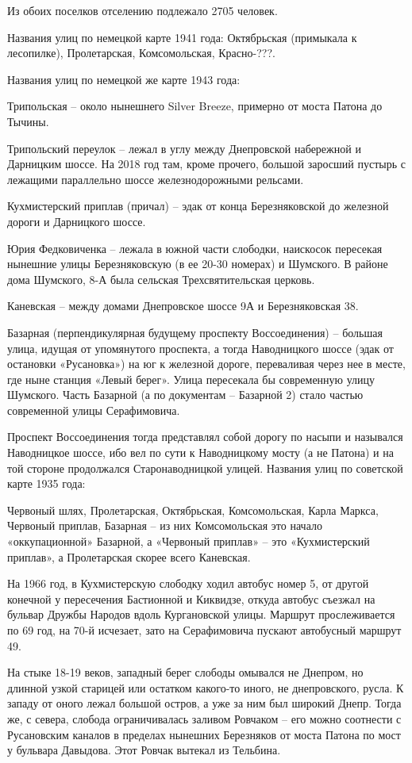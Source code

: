Из обоих поселков отселению подлежало 2705 человек.

Названия улиц по немецкой карте 1941 года: Октябрьская (примыкала к лесопилке), Пролетарская, Комсомольская, Красно-???.

Названия улиц по немецкой же карте 1943 года: 

Трипольская – около нынешнего Silver Breeze, примерно от моста Патона до Тычины. 

Трипольский переулок – лежал в углу между Днепровской набережной и Дарницким шоссе. На 2018 год там, кроме прочего, большой заросший пустырь с лежащими параллельно шоссе железнодорожными рельсами.

Кухмистерский приплав (причал) – эдак от конца Березняковской до железной дороги и Дарницкого шоссе. 

Юрия Федковиченка – лежала в южной части слободки, наискосок пересекая нынешние улицы Березняковскую (в ее 20-30 номерах) и Шумского. В районе дома Шумского, 8-А была сельская Трехсвятительская церковь. 

Каневская – между домами Днепровское шоссе 9А и Березняковская 38. 

Базарная (перпендикулярная будущему проспекту Воссоединения) – большая улица, идущая от упомянутого проспекта, а тогда Наводницкого шоссе (эдак от остановки «Русановка») на юг к железной дороге, переваливая через нее в месте, где ныне станция «Левый берег». Улица пересекала бы современную улицу Шумского. Часть Базарной (а по документам – Базарной 2) стало частью современной улицы Серафимовича.

Проспект Воссоединения тогда представлял собой дорогу по насыпи и назывался Наводницкое шоссе, ибо вел по сути к Наводницкому мосту (а не Патона) и на той стороне продолжался Старонаводницкой улицей. Названия улиц по советской карте 1935 года:

Червоный шлях, Пролетарская, Октябрьская, Комсомольская, Карла Маркса, Червоный приплав, Базарная – из них Комсомольская это начало «оккупационной» Базарной, а «Червоный приплав» – это «Кухмистерский приплав», а Пролетарская скорее всего Каневская.

На 1966 год, в Кухмистерскую слободку ходил автобус номер 5, от другой конечной у пересечения Бастионной и Киквидзе, откуда автобус съезжал на бульвар Дружбы Народов вдоль Кургановской улицы. Маршрут прослеживается по 69 год, на 70-й исчезает, зато на Серафимовича пускают автобусный маршрут 49.

На стыке 18-19 веков, западный берег слободы омывался не Днепром, но длинной узкой старицей или остатком какого-то иного, не днепровского, русла. К западу от оного лежал большой остров, а уже за ним был широкий Днепр. Тогда же, с севера, слобода ограничивалась заливом Ровчаком – его можно соотнести с Русановским каналов в пределах нынешних Березняков от моста Патона по мост у бульвара Давыдова. Этот Ровчак вытекал из Тельбина. 

